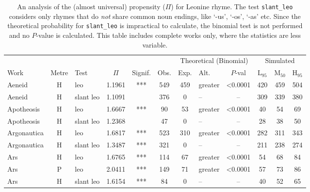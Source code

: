 \documentclass[twocolumn, switch]{article} %
\begin{document}
\begin{table}[h!]
\caption{
An analysis of the (almost universal) propensity ($\Pi$) for Leonine rhyme.
The test \texttt{slant\_leo} considers only rhymes that do \emph{not} share
common noun endings, like `-us', `-os', `-as' etc. Since the theoretical
probability for \texttt{slant\_leo} is impractical to calculate, the binomial
test is not performed and no $P$-value is calculated. This table includes
complete works only, where the statistics are less variable.
}
\label{tab:leo}
\par\medskip
\centering
  \begin{tabular}{lclcccclcc@{\hspace{1\tabcolsep}}c@{\hspace{1\tabcolsep}}c}
  \toprule
          &&&&&&\multicolumn{3}{c}{Theoretical (Binomial)}&\multicolumn{3}{c}{Simulated}\\\cmidrule(lr{2pt}){7-9}\cmidrule(l{2pt}r){10-12}
         Work & Metre &       Test &    $\Pi$ & Signif. &    Obs. &  Exp. & Alt. &  $P$-val & L$_{95}$ &  M$_{50}$ &  H$_{95}$ \\
  \midrule
        Aeneid &     H &        leo & 1.1961 &   *** &  549 &       459 &     greater & <0.0001 &  420 &  459 &  504 \\
        Aeneid &     H &  slant leo & 1.1091 &       &  376 &         0 &        -- & -- &  309 &  339 &  380 \\
    Apotheosis &     H &        leo & 1.6667 &   *** &   90 &        53 &     greater & <0.0001 &   40 &   54 &   69 \\
    Apotheosis &     H &  slant leo & 1.2368 &       &   47 &         0 &        -- & -- &   28 &   38 &   50 \\
   Argonautica &     H &        leo & 1.6817 &   *** &  523 &       310 &     greater & <0.0001 &  282 &  311 &  343 \\
   Argonautica &     H &  slant leo & 1.3487 &   *** &  321 &         0 &        -- & -- &  211 &  238 &  274 \\
           Ars &     H &        leo & 1.6765 &   *** &  114 &        67 &     greater & <0.0001 &   54 &   68 &   84 \\
           Ars &     P &        leo & 2.0411 &   *** &  149 &        71 &     greater & <0.0001 &   57 &   73 &   86 \\
           Ars &     H &  slant leo & 1.6154 &   *** &   84 &         0 &        -- & -- &   40 &   52 &   65 \\

\end{tabular}
\end{table}
\end{document}
